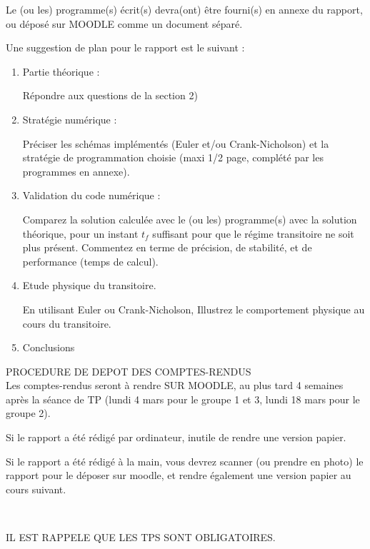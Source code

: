 \documentclass[a4,12pt]{article}
\begin{document}
\begin{enumerate}
Le (ou les) programme(s) écrit(s) devra(ont) être fourni(s) en annexe du rapport, ou déposé sur MOODLE comme un document séparé. 



\noindent

Une suggestion de plan pour le rapport est le suivant :
\begin{enumerate}
\item Partie théorique :

Répondre aux questions de la section 2)

\item Stratégie numérique : 

Préciser les schémas implémentés (Euler et/ou Crank-Nicholson) et la stratégie de programmation choisie
(maxi 1/2 page, complété par les programmes en annexe).

\item Validation du code numérique :

Comparez la solution calculée avec le (ou les) programme(s) avec la solution théorique, pour un instant $t_f$ suffisant pour que le régime transitoire ne soit plus présent. Commentez en terme de précision, de stabilité, et de performance (temps de calcul).

\item Etude physique du transitoire.

En utilisant Euler ou Crank-Nicholson,  Illustrez le comportement physique au cours du transitoire.


\item Conclusions
\end{enumerate}


\begin{center}
{\Large PROCEDURE DE DEPOT DES COMPTES-RENDUS}\\

Les comptes-rendus seront à rendre SUR MOODLE, au plus tard 4 semaines après 
la séance de TP (lundi 4 mars pour le groupe 1 et 3, lundi 18 mars pour le groupe 2).

Si le rapport a été rédigé par ordinateur, inutile de rendre une version papier.

Si le rapport a été rédigé à la main, vous devrez scanner (ou prendre en photo) le rapport pour le déposer sur moodle, et rendre également une version papier au cours suivant.







~
~\\


\begin{center}
{\large IL EST RAPPELE QUE LES TPS SONT OBLIGATOIRES.}
\end{center}

\end{center}






\end{enumerate}
\end{document}

